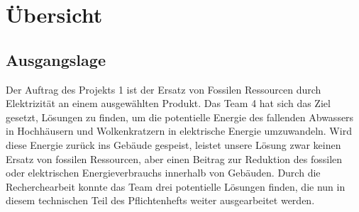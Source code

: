 \section{Übersicht} \label{sec:uebersicht}
\subsection{Ausgangslage}
Der Auftrag des Projekts 1 ist der Ersatz von Fossilen Ressourcen durch Elektrizität an einem ausgewählten Produkt. Das Team 4 hat sich das Ziel gesetzt, Lösungen zu finden, um die potentielle Energie des fallenden Abwassers in Hochhäusern und Wolkenkratzern in elektrische Energie umzuwandeln. Wird diese Energie zurück ins Gebäude gespeist, leistet unsere Lösung zwar keinen Ersatz von fossilen Ressourcen, aber einen Beitrag zur Reduktion des fossilen oder elektrischen Energieverbrauchs innerhalb von Gebäuden.
Durch die Recherchearbeit konnte das Team drei potentielle Lösungen finden, die nun in diesem technischen Teil des Pflichtenhefts weiter ausgearbeitet werden.
\renewcommand\arraystretch{1.5}
